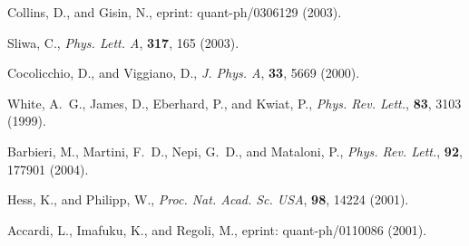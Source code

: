 \documentclass[pra,amsmath,amsfonts,showkeys,showpacs,preprint]{revtex4}
\begin{document}
\begin{thebibliography}{10}
Collins, D., and Gisin, N., eprint: quant-ph/0306129 (2003).

Sliwa, C., \emph{Phys. Lett. A}, \textbf{317}, 165 (2003).

Cocolicchio, D., and Viggiano, D., \emph{J. Phys. A}, \textbf{33}, 5669
  (2000).

White, A.~G., James, D., Eberhard, P., and Kwiat, P., \emph{Phys. Rev. Lett.},
  \textbf{83}, 3103 (1999).

Barbieri, M., Martini, F.~D., Nepi, G.~D., and Mataloni, P., \emph{Phys. Rev.
  Lett.}, \textbf{92}, 177901 (2004).

Hess, K., and Philipp, W., \emph{Proc. Nat. Acad. Sc. USA}, \textbf{98},
  14224 (2001).

Accardi, L., Imafuku, K., and Regoli, M., eprint: quant-ph/0110086 (2001).

\end{thebibliography}


%
\end{document}
